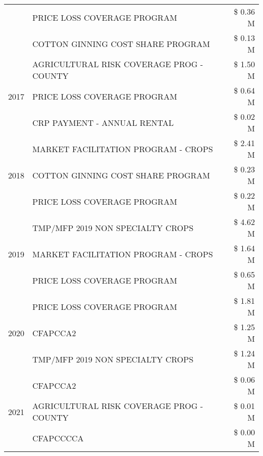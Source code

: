 \begin{tabular}{llr}
 & PRICE LOSS COVERAGE PROGRAM & \$ 0.36 M \\
 & COTTON GINNING COST SHARE PROGRAM & \$ 0.13 M \\
\cline{1-3}
\multirow[t]{3}{*}{2017} & AGRICULTURAL RISK COVERAGE PROG - COUNTY & \$ 1.50 M \\
 & PRICE LOSS COVERAGE PROGRAM & \$ 0.64 M \\
 & CRP PAYMENT - ANNUAL RENTAL & \$ 0.02 M \\
\cline{1-3}
\multirow[t]{3}{*}{2018} & MARKET FACILITATION PROGRAM - CROPS & \$ 2.41 M \\
 & COTTON GINNING COST SHARE PROGRAM & \$ 0.23 M \\
 & PRICE LOSS COVERAGE PROGRAM & \$ 0.22 M \\
\cline{1-3}
\multirow[t]{3}{*}{2019} & TMP/MFP 2019 NON SPECIALTY CROPS & \$ 4.62 M \\
 & MARKET FACILITATION PROGRAM - CROPS & \$ 1.64 M \\
 & PRICE LOSS COVERAGE PROGRAM & \$ 0.65 M \\
\cline{1-3}
\multirow[t]{3}{*}{2020} & PRICE LOSS COVERAGE PROGRAM & \$ 1.81 M \\
 & CFAPCCA2 & \$ 1.25 M \\
 & TMP/MFP 2019 NON SPECIALTY CROPS & \$ 1.24 M \\
\cline{1-3}
\multirow[t]{3}{*}{2021} & CFAPCCA2 & \$ 0.06 M \\
 & AGRICULTURAL RISK COVERAGE PROG - COUNTY & \$ 0.01 M \\
 & CFAPCCCCA & \$ 0.00 M \\
\cline{1-3}
\bottomrule
\end{tabular}
